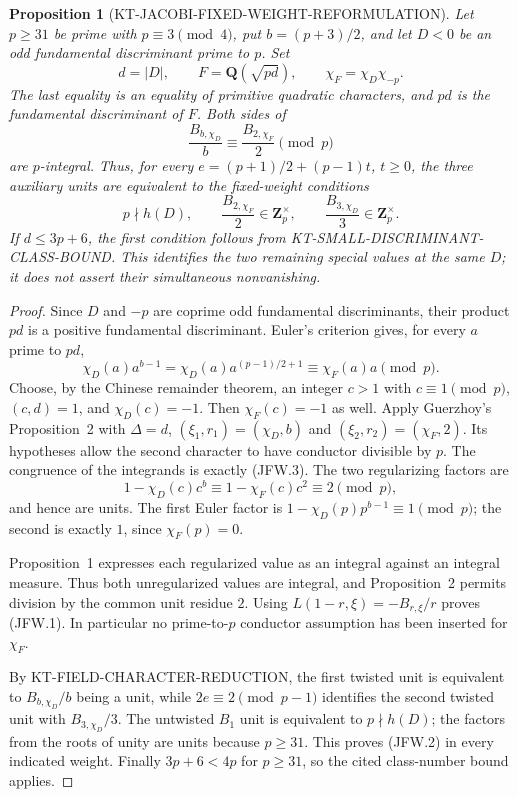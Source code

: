 \documentclass[11pt,a4paper]{article}
\newtheorem{proposition}[theorem]{Proposition}
\theoremstyle{definition}
\begin{document}
\begin{proposition}[KT-JACOBI-FIXED-WEIGHT-REFORMULATION]
Let $p\ge31$ be prime with $p\equiv3\pmod4$, put
$b=(p+3)/2$, and let $D<0$ be an odd fundamental discriminant
prime to $p$.  Set
\[
 d=|D|,\qquad F=\mathbf Q(\sqrt{pd}),\qquad
 \chi_F=\chi_D\chi_{-p}.
\]
The last equality is an equality of primitive quadratic characters,
and $pd$ is the fundamental discriminant of $F$.  Both sides of
\[
 \frac{B_{b,\chi_D}}b\equiv\frac{B_{2,\chi_F}}2\pmod p
                                                        \tag{JFW.1}
\]
are $p$-integral.  Thus, for every
$e=(p+1)/2+(p-1)t$, $t\ge0$, the three auxiliary units are
equivalent to the fixed-weight conditions
\[
 p\nmid h(D),\qquad
 \frac{B_{2,\chi_F}}2\in\mathbf Z_p^\times,\qquad
 \frac{B_{3,\chi_D}}3\in\mathbf Z_p^\times.              \tag{JFW.2}
\]
If $d\le3p+6$, the first condition follows from
KT-SMALL-DISCRIMINANT-CLASS-BOUND.  This identifies the two
remaining special values at the same $D$; it does not assert their
simultaneous nonvanishing.
\end{proposition}

\begin{proof}
Since $D$ and $-p$ are coprime odd fundamental discriminants,
their product $pd$ is a positive fundamental discriminant.  Euler's
criterion gives, for every $a$ prime to $pd$,
\[
 \chi_D(a)a^{b-1}
 =\chi_D(a)a^{(p-1)/2+1}
 \equiv\chi_F(a)a\pmod p.                              \tag{JFW.3}
\]
Choose, by the Chinese remainder theorem, an integer $c>1$ with
$c\equiv1\pmod p$, $(c,d)=1$, and $\chi_D(c)=-1$.
Then $\chi_F(c)=-1$ as well.  Apply Guerzhoy's Proposition~2
with $\Delta=d$, $(\xi_1,r_1)=(\chi_D,b)$ and
$(\xi_2,r_2)=(\chi_F,2)$.  Its hypotheses allow the second
character to have conductor divisible by $p$.
The congruence of the integrands is exactly (JFW.3).  The two
regularizing factors are
\[
 1-\chi_D(c)c^b\equiv
 1-\chi_F(c)c^2\equiv2\pmod p,
\]
and hence are units.  The first Euler factor is
$1-\chi_D(p)p^{b-1}\equiv1\pmod p$; the second is exactly
$1$, since $\chi_F(p)=0$.

Proposition~1 expresses each regularized value as an integral
against an integral measure.  Thus both unregularized values
are integral, and Proposition~2 permits division by the common
unit residue $2$.  Using $L(1-r,\xi)=-B_{r,\xi}/r$ proves
(JFW.1).  In particular no prime-to-$p$ conductor assumption has
been inserted for $\chi_F$.

By KT-FIELD-CHARACTER-REDUCTION, the first twisted unit is
equivalent to $B_{b,\chi_D}/b$ being a unit, while
$2e\equiv2\pmod{p-1}$ identifies the second twisted unit
with $B_{3,\chi_D}/3$.  The untwisted $B_1$ unit is
equivalent to $p\nmid h(D)$; the factors from the roots of
unity are units because $p\ge31$.  This proves (JFW.2) in
every indicated weight.  Finally $3p+6<4p$ for $p\ge31$,
so the cited class-number bound applies.
\end{proof}
\end{document}

